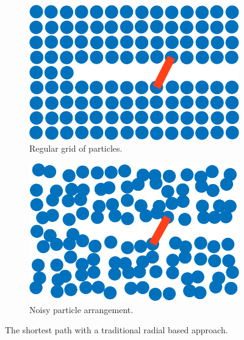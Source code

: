 \documentclass[11pt,a4paper, final, twoside]{article}
\theoremstyle{proposition}
\theoremstyle{definition}
\theoremstyle{remark}
\numberwithin{equation}{section}
\begin{document}
\begin{figure}[h]
\centering
\begin{subfigure}[t]{.5\textwidth}
  \centering
  \includegraphics[width=.7\linewidth]{jumpLineGrid.png}
  \caption{Regular grid of particles.}
\end{subfigure}%
\begin{subfigure}[t]{.5\textwidth}
  \centering
  \includegraphics[width=.7\linewidth]{jumpLine.png}
  \caption{Noisy particle arrangement.}
\end{subfigure}

\caption{The shortest path with a traditional radial based approach.}
\label{fig:jump}
\end{figure}
\end{document}
